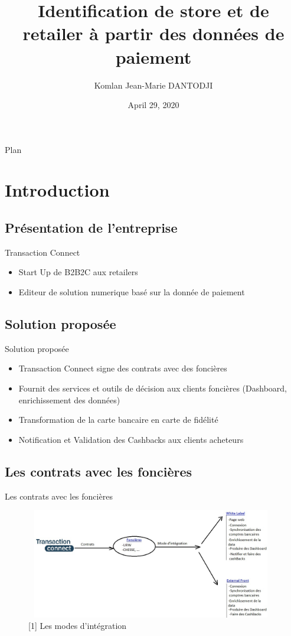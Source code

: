\documentclass{beamer}
\title[Identification de la source d'une transaction] 
{Identification de store et de retailer à partir des données de paiement}
\author[Komlan Dantodji] 
{Komlan Jean-Marie DANTODJI}
\institute[]
{
  Etudiant en M1 Big Data
  \and
  Université Paris 8}
\date{April 29, 2020}
\begin{document}
\begin{frame}
  \titlepage
\end{frame}

\begin{frame}{Plan}
  \tableofcontents
\end{frame}

\section{Introduction}
\subsection{Présentation de l'entreprise}
\begin{frame}{Transaction Connect}
\begin{itemize}
		\item Start Up de B2B2C aux retailers
		\item Editeur de solution numerique basé sur la donnée de paiement
\end{itemize}
\end{frame}

\subsection{Solution proposée}
\begin{frame}{Solution proposée}
\begin{itemize}
		\item Transaction Connect signe des contrats avec des foncières
		\item Fournit des services et outils de décision aux clients foncières (Dashboard, enrichissement des données)
		\item Transformation de la carte bancaire en carte de fidélité
		\item Notification et Validation des Cashbacks aux clients acheteurs
\end{itemize}
\end{frame}
\subsection{Les contrats avec les foncières}
\begin{frame}{Les contrats avec les foncières}
\begin{figure}[H]
    \includegraphics[width=11cm,height=4.8cm]{images/contrat.jpeg}
    \caption{[1] Les modes d'intégration}
    \label{fig:L1}
\end{figure}
\end{frame}
\end{document}
